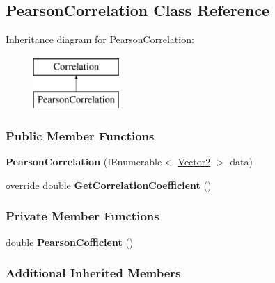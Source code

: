 \hypertarget{classDataTools_1_1correlation_1_1PearsonCorrelation}{}\subsection{Pearson\+Correlation Class Reference}
\label{classDataTools_1_1correlation_1_1PearsonCorrelation}
Inheritance diagram for Pearson\+Correlation\+:\begin{figure}[H]
\begin{center}
\leavevmode
\includegraphics[height=2.000000cm]{classDataTools_1_1correlation_1_1PearsonCorrelation}
\end{center}
\end{figure}
\subsubsection*{Public Member Functions}
\begin{DoxyCompactItemize}
\item 
\mbox{\label{classDataTools_1_1correlation_1_1PearsonCorrelation_afaeef6d70f6c46171dbd457e3c61c0b8}} 
{\bfseries Pearson\+Correlation} (I\+Enumerable$<$ \hyperlink{classDataTools_1_1Vector2}{Vector2} $>$ data)
\item 
\mbox{\label{classDataTools_1_1correlation_1_1PearsonCorrelation_afff258bf05afa59c8fd4118e650e1682}} 
override double {\bfseries Get\+Correlation\+Coefficient} ()
\end{DoxyCompactItemize}
\subsubsection*{Private Member Functions}
\begin{DoxyCompactItemize}
\item 
\mbox{\label{classDataTools_1_1correlation_1_1PearsonCorrelation_ae3cdfc31b0bf7fc96a06c7489dffe561}} 
double {\bfseries Pearson\+Cofficient} ()
\end{DoxyCompactItemize}
\subsubsection*{Additional Inherited Members}
